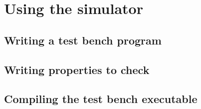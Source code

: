 \documentclass[12pt,a4paper]{article}
\begin{document}
\begin{enumerate}
%
%
%
%
%
%
%
%
%
%
%
%
%
%



\end{enumerate}

\clearpage
\section{Using the simulator} \label{Sec:Usage}

\subsection{Writing a test bench program}

\subsection{Writing properties to check}

\subsection{Compiling the test bench executable}
\end{document}
